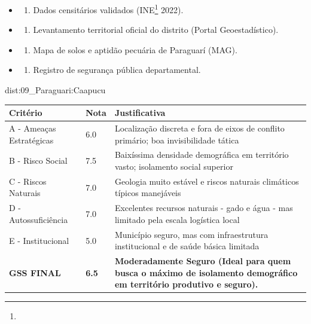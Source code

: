 {\begin{itemize}
\tightlist
\item
  \begin{enumerate}
  \def\labelenumi{\arabic{enumi})}
  \tightlist
  \item
    Dados censitários validados (INE\footnote{\fineINE} 2022).
  \end{enumerate}
\item
  \begin{enumerate}
  \def\labelenumi{\arabic{enumi})}
  \setcounter{enumi}{1}
  \tightlist
  \item
    Levantamento territorial oficial do distrito (Portal
    Geoestadístico).
  \end{enumerate}
\item
  \begin{enumerate}
  \def\labelenumi{\arabic{enumi})}
  \setcounter{enumi}{2}
  \tightlist
  \item
    Mapa de solos e aptidão pecuária de Paraguarí (MAG).
  \end{enumerate}
\item
  \begin{enumerate}
  \def\labelenumi{\arabic{enumi})}
  \setcounter{enumi}{3}
  \tightlist
  \item
    Registro de segurança pública departamental.
  \end{enumerate}
\end{itemize}}{dist:09_Paraguari:Caapucu}
\begin{table}[ht!]
\small \begin{tabular}{p{3.0cm}p{0.8cm}p{6.0cm}} \toprule
\textbf{Critério} & \textbf{Nota} & \textbf{Justificativa} \\ \midrule
A - Ameaças Estratégicas & 6.0 & Localização discreta e fora de eixos de conflito primário; boa invisibilidade tática \\
B - Risco Social & 7.5 & Baixíssima densidade demográfica em território vasto; isolamento social superior \\
C - Riscos Naturais & 7.0 & Geologia muito estável e riscos naturais climáticos típicos manejáveis \\
D - Autossuficiência & 7.0 & Excelentes recursos naturais - gado e água - mas limitado pela escala logística local \\
E - Institucional & 5.0 & Município seguro, mas com infraestrutura institucional e de saúde básica limitada \\
\midrule \textbf{GSS FINAL} & \textbf{6.5} & \textbf{Moderadamente Seguro (Ideal para quem busca o máximo de isolamento demográfico em território produtivo e seguro).} \\ \bottomrule \end{tabular}
\end{table}
